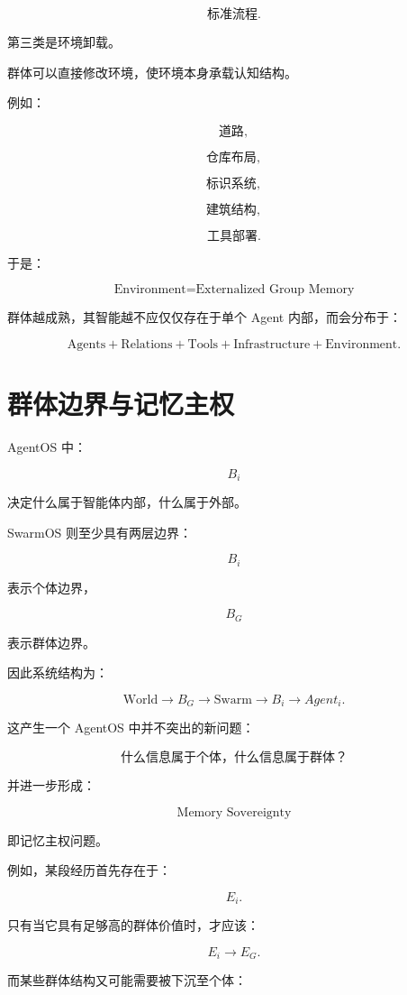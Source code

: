 \[
\text{标准流程}.
\]

第三类是环境卸载。

群体可以直接修改环境，使环境本身承载认知结构。

例如：

\[
\text{道路},
\]

\[
\text{仓库布局},
\]

\[
\text{标识系统},
\]

\[
\text{建筑结构},
\]

\[
\text{工具部署}.
\]

于是：

\[
\boxed{
\text{Environment}
=
\text{Externalized Group Memory}
}
\]

群体越成熟，其智能越不应仅仅存在于单个 Agent 内部，而会分布于：

\[
\text{Agents}
+
\text{Relations}
+
\text{Tools}
+
\text{Infrastructure}
+
\text{Environment}.
\]


\section{群体边界与记忆主权}

AgentOS 中：

\[
B_i
\]

决定什么属于智能体内部，什么属于外部。

SwarmOS 则至少具有两层边界：

\[
B_i
\]

表示个体边界，

\[
B_G
\]

表示群体边界。

因此系统结构为：

\[
\text{World}
\rightarrow
B_G
\rightarrow
\text{Swarm}
\rightarrow
B_i
\rightarrow
Agent_i.
\]

这产生一个 AgentOS 中并不突出的新问题：

\[
\boxed{
\text{什么信息属于个体，什么信息属于群体？}
}
\]

并进一步形成：

\[
\boxed{
\text{Memory Sovereignty}
}
\]

即记忆主权问题。

例如，某段经历首先存在于：

\[
E_i.
\]

只有当它具有足够高的群体价值时，才应该：

\[
E_i
\rightarrow
E_G.
\]

而某些群体结构又可能需要被下沉至个体：

